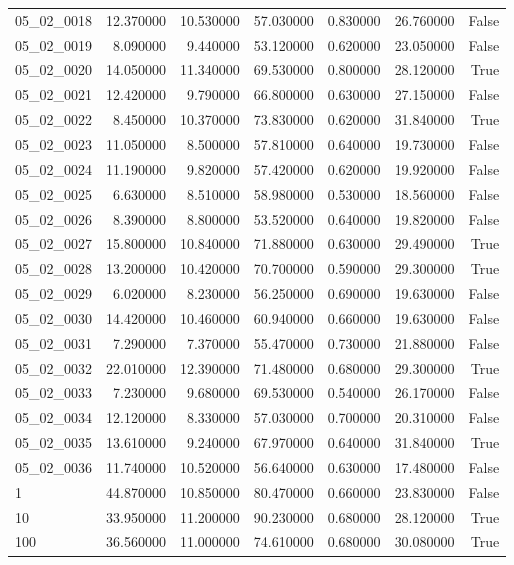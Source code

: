 \begin{table}
\begin{tabular}{lrrrrrr}
05\_02\_0018 & 12.370000 & 10.530000 & 57.030000 & 0.830000 & 26.760000 & False \\
05\_02\_0019 & 8.090000 & 9.440000 & 53.120000 & 0.620000 & 23.050000 & False \\
05\_02\_0020 & 14.050000 & 11.340000 & 69.530000 & 0.800000 & 28.120000 & True \\
05\_02\_0021 & 12.420000 & 9.790000 & 66.800000 & 0.630000 & 27.150000 & False \\
05\_02\_0022 & 8.450000 & 10.370000 & 73.830000 & 0.620000 & 31.840000 & True \\
05\_02\_0023 & 11.050000 & 8.500000 & 57.810000 & 0.640000 & 19.730000 & False \\
05\_02\_0024 & 11.190000 & 9.820000 & 57.420000 & 0.620000 & 19.920000 & False \\
05\_02\_0025 & 6.630000 & 8.510000 & 58.980000 & 0.530000 & 18.560000 & False \\
05\_02\_0026 & 8.390000 & 8.800000 & 53.520000 & 0.640000 & 19.820000 & False \\
05\_02\_0027 & 15.800000 & 10.840000 & 71.880000 & 0.630000 & 29.490000 & True \\
05\_02\_0028 & 13.200000 & 10.420000 & 70.700000 & 0.590000 & 29.300000 & True \\
05\_02\_0029 & 6.020000 & 8.230000 & 56.250000 & 0.690000 & 19.630000 & False \\
05\_02\_0030 & 14.420000 & 10.460000 & 60.940000 & 0.660000 & 19.630000 & False \\
05\_02\_0031 & 7.290000 & 7.370000 & 55.470000 & 0.730000 & 21.880000 & False \\
05\_02\_0032 & 22.010000 & 12.390000 & 71.480000 & 0.680000 & 29.300000 & True \\
05\_02\_0033 & 7.230000 & 9.680000 & 69.530000 & 0.540000 & 26.170000 & False \\
05\_02\_0034 & 12.120000 & 8.330000 & 57.030000 & 0.700000 & 20.310000 & False \\
05\_02\_0035 & 13.610000 & 9.240000 & 67.970000 & 0.640000 & 31.840000 & True \\
05\_02\_0036 & 11.740000 & 10.520000 & 56.640000 & 0.630000 & 17.480000 & False \\
1 & 44.870000 & 10.850000 & 80.470000 & 0.660000 & 23.830000 & False \\
10 & 33.950000 & 11.200000 & 90.230000 & 0.680000 & 28.120000 & True \\
100 & 36.560000 & 11.000000 & 74.610000 & 0.680000 & 30.080000 & True \\

\end{tabular}
\end{table}
